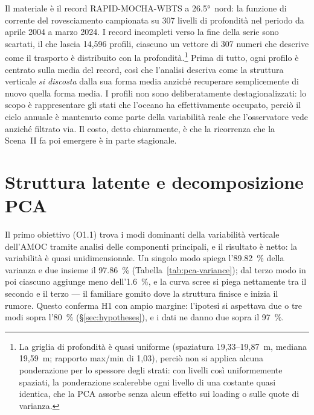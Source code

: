 Il materiale è il record RAPID-MOCHA-WBTS a \ang{26.5}~nord: la funzione di corrente del rovesciamento campionata su 307 livelli di profondità nel periodo da aprile 2004 a marzo 2024. I record incompleti verso la fine della serie sono scartati, il che lascia 14{,}596 profili, ciascuno un vettore di 307 numeri che descrive come il trasporto è distribuito con la profondità.\footnote{La griglia di profondità è quasi uniforme (spaziatura 19,33--19,87~m, mediana 19,59~m; rapporto max/min di 1,03), perciò non si applica alcuna ponderazione per lo spessore degli strati: con livelli così uniformemente spaziati, la ponderazione scalerebbe ogni livello di una costante quasi identica, che la PCA assorbe senza alcun effetto sui loading o sulle quote di varianza.} Prima di tutto, ogni profilo è centrato sulla media del record, così che l'analisi descriva come la struttura verticale \emph{si discosta} dalla sua forma media anziché recuperare semplicemente di nuovo quella forma media. I profili non sono deliberatamente destagionalizzati: lo scopo è rappresentare gli stati che l'oceano ha effettivamente occupato, perciò il ciclo annuale è mantenuto come parte della variabilità reale che l'osservatore vede anziché filtrato via. Il costo, detto chiaramente, è che la ricorrenza che la Scena~II fa poi emergere è in parte stagionale.

\section{Struttura latente e decomposizione PCA}
\label{sec:detect-pca}

Il primo obiettivo (O1.1) trova i modi dominanti della variabilità verticale dell'AMOC tramite analisi delle componenti principali, e il risultato è netto: la variabilità è quasi unidimensionale. Un singolo modo spiega l'\SI{89.82}{\percent} della varianza e due insieme il \SI{97.86}{\percent} (Tabella~\ref{tab:pca-variance}); dal terzo modo in poi ciascuno aggiunge meno dell'\SI{1.6}{\percent}, e la curva scree si piega nettamente tra il secondo e il terzo --- il familiare gomito dove la struttura finisce e inizia il rumore. Questo conferma H1 con ampio margine: l'ipotesi si aspettava due o tre modi sopra l'\SI{80}{\percent} (\S\ref{sec:hypotheses}), e i dati ne danno due sopra il \SI{97}{\percent}.




